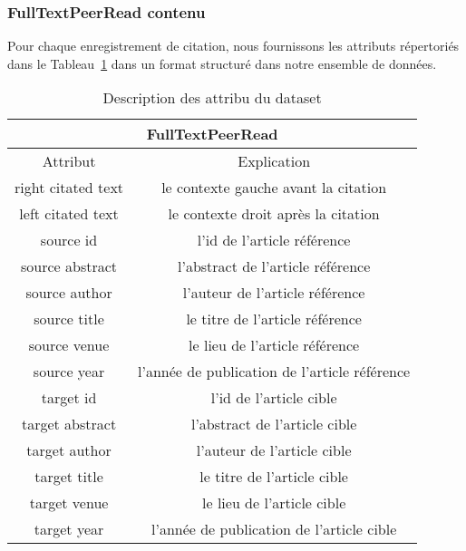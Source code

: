             \subsubsection{FullTextPeerRead contenu }
            \par Pour chaque enregistrement de citation, nous fournissons les attributs répertoriés dans le Tableau~\ref{table:2} dans un format structuré dans notre ensemble de données.
            
            \begin{table}[H]
            \centering
            \begin{tabular}{ | c | c | } 
            \hline
            \multicolumn{2}{|c|}{ FullTextPeerRead } \\
            \hline
            Attribut & Explication \\
            \hline\hline
            
            right citated text  &   le contexte gauche avant la citation                \\
            left citated text   &   le contexte droit après la citation                 \\ 
            source id           &   l'id de l'article référence                            \\
            source abstract     &   l'abstract de l'article référence                      \\
            source author       &   l'auteur de l'article référence                        \\
            source title        &   le titre de l'article référence                        \\
            source venue        &   le lieu de l'article référence                         \\
            source year         &   l'année de publication de l'article référence          \\
            target id           &   l'id de l'article cible                                \\
            target abstract     &   l'abstract de l'article cible                          \\
            target author       &   l'auteur de l'article cible                            \\
            target title        &   le titre de l'article cible                            \\ 
            target venue        &   le lieu de l'article cible                             \\
            target year         &   l'année de publication de l'article cible              \\ 
            \hline
            \end{tabular}
            \caption{Description des attribu du dataset}
            \label{table:2}
            \end{table}
        
